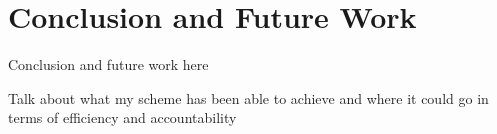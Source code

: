 \chapter{Conclusion and Future Work}
\label{chap:conclusions}

Conclusion and future work here

Talk about what my scheme has been able to achieve and where it could go in terms of efficiency and accountability
